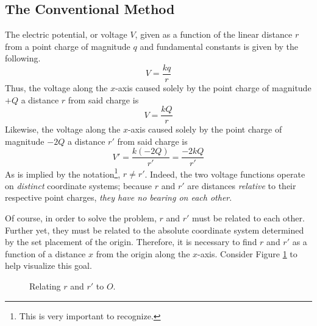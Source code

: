 \documentclass[titlepage]{article}
\begin{document}
\subsection*{The Conventional Method}
The electric potential, or voltage $V$, given as a function of the linear distance $r$ from a point charge of magnitude $q$ and fundamental constants is given by the following.
\begin{equation*}
    V=\frac{kq}{r}
\end{equation*}
Thus, the voltage along the $x$-axis caused solely by the point charge of magnitude $+Q$ a distance $r$ from said charge is $$V=\frac{kQ}{r}$$Likewise, the voltage along the $x$-axis caused solely by the point charge of magnitude $-2Q$ a distance $r'$ from said charge is $$V'=\frac{k(-2Q)}{r'}=\frac{-2kQ}{r'}$$As is implied by the notation\footnote{This is very important to recognize.}, $r\neq r'$. Indeed, the two voltage functions operate on \emph{distinct} coordinate systems; because $r$ and $r'$ are distances \emph{relative} to their respective point charges, \emph{they have no bearing on each other}.\par
Of course, in order to solve the problem, $r$ and $r'$ must be related to each other. Further yet, they must be related to the absolute coordinate system determined by the set placement of the origin. Therefore, it is necessary to find $r$ and $r'$ as a function of a distance $x$ from the origin along the $x$-axis. Consider Figure \ref{fig:rAndrPrime} to help visualize this goal.

\begin{figure}[h!]
    \centering
    \caption{Relating $r$ and $r'$ to $O$.}
    \label{fig:rAndrPrime}
\end{figure}
\end{document}
